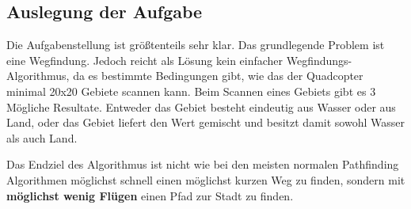 \documentclass[a4paper,12pt]{article}
\begin{document}
\subsection{Auslegung der Aufgabe}
Die Aufgabenstellung ist größtenteils sehr klar. Das grundlegende Problem ist eine Wegfindung. Jedoch reicht als Lösung kein einfacher Wegfindungs-Algorithmus, da es bestimmte Bedingungen gibt, wie das der Quadcopter minimal 20x20 Gebiete scannen kann. Beim Scannen eines Gebiets gibt es 3 Mögliche Resultate. Entweder das Gebiet besteht eindeutig aus Wasser oder aus Land, oder das Gebiet liefert den Wert gemischt und besitzt damit sowohl Wasser als auch Land.

Das Endziel des Algorithmus ist nicht wie bei den meisten normalen Pathfinding Algorithmen möglichst schnell einen möglichst kurzen Weg zu finden, sondern mit \textbf{möglichst wenig Flügen} einen Pfad zur Stadt zu finden.
\end{document}

